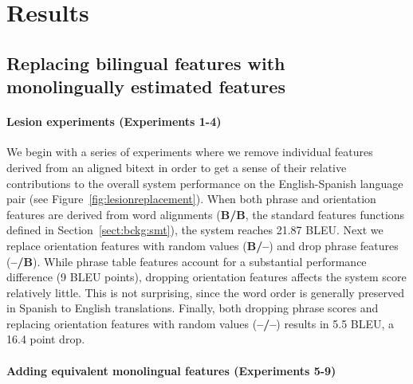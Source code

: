 \documentclass[11pt]{article}
\newcommand{\secref}[1]{Section~\ref{#1}}
\newcommand{\figref}[1]{Figure~\ref{#1}}
\begin{document}



\section{Results} \label{sect:results}

\subsection{Replacing bilingual features with monolingually estimated features}\label{sect:exp:lesions}

\paragraph{Lesion experiments (Experiments 1-4)}

We begin with a series of experiments where we remove individual features derived from an aligned bitext in order to get a sense of their relative contributions to the overall system performance on the English-Spanish language pair (see \figref{fig:lesionreplacement}). When both phrase and orientation features are derived from word alignments ({\bf B/B}, the standard features functions defined in \secref{sect:bckg:smt}), the system reaches 21.87 BLEU.  Next we replace orientation features with random values ({\bf B/--}) and drop phrase features ({\bf --/B}).  While phrase table features account for a substantial performance difference (9 BLEU points), dropping orientation features affects the system score relatively little.  This is not surprising, since the word order is generally preserved in Spanish to English translations.  Finally, both dropping phrase scores and replacing orientation features with random values ({\bf --/--}) results in 5.5 BLEU, a 16.4 point drop.

\paragraph{Adding equivalent monolingual features (Experiments 5-9)} \label{sect:exp:replacement}
\end{document}

